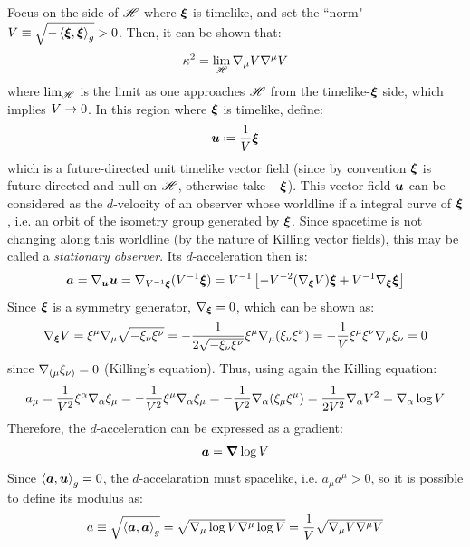 Focus on the side of $ \mathscr{H} $ where $ \boldsymbol{\xi} $ is timelike, and set the ``norm" $ V \equiv \sqrt{- \braket{\boldsymbol{\xi} , \boldsymbol{\xi}}_g} > 0 $. Then, it can be shown that:
\begin{equation}
  \kappa^2 = \lim_\mathscr{H} \nabla_\mu V \nabla^\mu V
  \label{eq:sg-lim}
\end{equation}
where $ \lim_\mathscr{H} $ is the limit as one approaches $ \mathscr{H} $ from the timelike-$ \boldsymbol{\xi} $ side, which implies $ V \rightarrow 0 $. In this region where $ \boldsymbol{\xi} $ is timelike, define:
\begin{equation}
  \uu \defeq \frac{1}{V} \xib
\end{equation}
which is a future-directed unit timelike vector field (since by convention $ \boldsymbol{\xi} $ is future-directed and null on $ \mathscr{H} $, otherwise take $ - \boldsymbol{\xi} $). This vector field $ \boldsymbol{u} $ can be considered as the $ d $-velocity of an observer whose worldline if a integral curve of $ \boldsymbol{\xi} $, i.e. an orbit of the isometry group generated by $ \boldsymbol{\xi} $. Since spacetime is not changing along this worldline (by the nature of Killing vector fields), this may be called a \emph{stationary observer}. Its $ d $-acceleration then is:
\begin{equation*}
  \boldsymbol{a} = \nabla_{\boldsymbol{u}} \boldsymbol{u} = \nabla_{V^{-1} \boldsymbol{\xi}} (V^{-1} \boldsymbol{\xi}) = V^{-1} \left[ -V^{-2} (\nabla_{\boldsymbol{\xi}} V) \boldsymbol{\xi} + V^{-1} \nabla_{\boldsymbol{\xi}} \boldsymbol{\xi} \right]
\end{equation*}
Since $ \boldsymbol{\xi} $ is a symmetry generator, $ \nabla_{\boldsymbol{\xi}} = 0 $, which can be shown as:
\begin{equation*}
  \nabla_{\boldsymbol{\xi}} V = \xi^\mu \nabla_\mu \sqrt{- \xi_\nu \xi^\nu} = - \frac{1}{2 \sqrt{- \xi_\nu \xi^\nu}} \xi^\mu \nabla_\mu (\xi_\nu \xi^\nu) = - \frac{1}{V} \xi^\mu \xi^\nu \nabla_\mu \xi_\nu = 0
\end{equation*}
since $ \nabla_{(\mu} \xi_{\nu)} = 0 $ (Killing's equation). Thus, using again the Killing equation:
\begin{equation*}
  a_\mu = \frac{1}{V^2} \xi^\alpha \nabla_\alpha \xi_\mu = - \frac{1}{V^2} \xi^\mu \nabla_\alpha \xi_\mu = - \frac{1}{V^2} \nabla_\alpha (\xi_\mu \xi^\mu) = \frac{1}{2V^2} \nabla_\alpha V^2 = \nabla_\alpha \log V
\end{equation*}
Therefore, the $ d $-acceleration can be expressed as a gradient:
\begin{equation}
  \boldsymbol{a} = \boldsymbol{\nabla} \log V
\end{equation}
Since $ \braket{\boldsymbol{a} , \boldsymbol{u}}_g = 0 $, the $ d $-accelaration must spacelike, i.e. $ a_\mu a^\mu > 0 $, so it is possible to define its modulus as:
\begin{equation*}
  a \equiv \sqrt{\braket{\boldsymbol{a} , \boldsymbol{a}}_g} = \sqrt{\nabla_\mu \log V \nabla^\mu \log V} = \frac{1}{V} \sqrt{\nabla_\mu V \nabla^\mu V}
\end{equation*}
